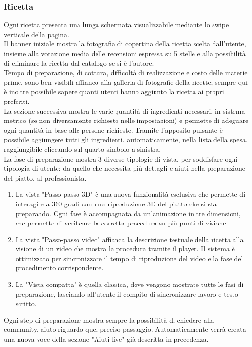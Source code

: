 \subsubsection{Ricetta}
Ogni ricetta presenta una lunga schermata visualizzabile mediante lo swipe verticale della pagina.\\
Il banner iniziale mostra la fotografia di copertina della ricetta scelta dall'utente, insieme alla votazione media delle recensioni espressa su 5 stelle e alla possibilità di eliminare la ricetta dal catalogo se si è l'autore.\\
Tempo di preparazione, di cottura, difficoltà di realizzazione e costo delle materie prime, sono ben visibili affianco alla galleria di fotografie della ricette; sempre qui è inoltre possibile sapere quanti utenti hanno aggiunto la ricetta ai propri preferiti.\\
La sezione successiva mostra le varie quantità di ingredienti necessari, in sistema metrico (se non diversamente richiesto nelle impostazioni) e permette di adeguare ogni quantità in base alle persone richieste. Tramite l'apposito pulsante è possibile aggiungere tutti gli ingredienti, automaticamente, nella lista della spesa, raggiungibile cliccando sul quarto simbolo a sinistra.\\
La fase di preparazione mostra 3 diverse tipologie di vista, per soddisfare ogni tipologia di utente: da quello che necessita più dettagli e aiuti nella preparazione del piatto, al professionista.\\
\begin{enumerate}
\item La vista "Passo-passo 3D" è una nuova funzionalità esclusiva che permette di interagire a 360 gradi con una riproduzione 3D del piatto che si sta preparando. Ogni fase è accompagnata da un'animazione in tre dimensioni, che permette di verificare la corretta procedura su più punti di visione.
\item La vista "Passo-passo video" affianca la descrizione testuale della ricetta alla visione di un video che mostra la procedura tramite il player. Il sistema è ottimizzato per sincronizzare il tempo di riproduzione del video e la fase del procedimento corrispondente.
\item La "Vista compatta" è quella classica, dove vengono mostrate tutte le fasi di preparazione, lasciando all'utente il compito di sincronizzare lavoro e testo scritto.
\end{enumerate}
Ogni step di preparazione mostra sempre la possibilità di chiedere alla community, aiuto riguardo quel preciso passaggio. Automaticamente verrà creata una nuova voce della sezione "Aiuti live" già descritta in precedenza.\\
